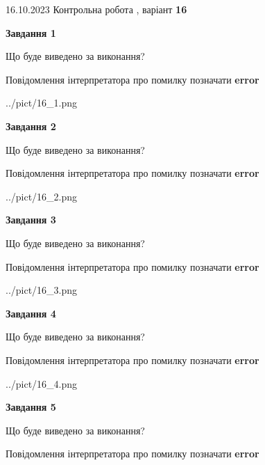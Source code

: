 \documentclass[12pt, ukrainian]{article}
\begin{document}
{\Large{16.10.2023 Контрольна робота , варіант  \No \textbf { 16 }\par}}
{
\begin {large}
{\begin {center}\textbf{Завдання 1}\end {center}}\par
Що буде виведено за виконання? \par
Повідомлення інтерпретатора про помилку позначати \textbf{error}

\begin{center}
	{../pict/16_1.png}
\end{center}
\newpage

{\begin {center}\textbf{Завдання 2}\end {center}}\par
Що буде виведено за виконання? \par
Повідомлення інтерпретатора про помилку позначати \textbf{error}

\begin{center}
	{../pict/16_2.png}
\end{center}
\newpage

{\begin {center}\textbf{Завдання 3}\end {center}}\par
Що буде виведено за виконання? \par
Повідомлення інтерпретатора про помилку позначати \textbf{error}

\begin{center}
	{../pict/16_3.png}
\end{center}
\newpage

{\begin {center}\textbf{Завдання 4}\end {center}}\par
Що буде виведено за виконання? \par
Повідомлення інтерпретатора про помилку позначати \textbf{error}

\begin{center}
	{../pict/16_4.png}
\end{center}
\newpage

{\begin {center}\textbf{Завдання 5}\end {center}}\par
Що буде виведено за виконання? \par
Повідомлення інтерпретатора про помилку позначати \textbf{error}


\end{large}}
\end{document}

